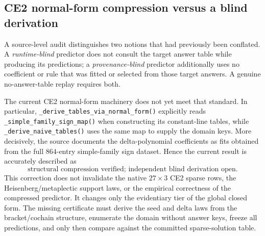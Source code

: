 \subsection{CE2 normal-form compression versus a blind derivation}
\label{subsec:ce2-blindness}

A source-level audit distinguishes two notions that had previously been conflated.  A
\emph{runtime-blind} predictor does not consult the target answer table while producing its
predictions; a \emph{provenance-blind} predictor additionally uses no coefficient or rule
that was fitted or selected from those target answers.  A genuine no-answer-table replay
requires both.

The current CE2 normal-form machinery does not yet meet that standard.  In particular,
\verb|_derive_tables_via_normal_form()| explicitly reads
\verb|_simple_family_sign_map()| when constructing its constant-line tables, while
\verb|_derive_naive_tables()| uses the same map to supply the domain keys.  More decisively,
the source documents the delta-polynomial coefficients as fits obtained from the full
$864$-entry simple-family sign dataset.  Hence the current result is accurately described as
\[
 \boxed{\text{structural compression verified; independent blind derivation open}.}
\]
This correction does not invalidate the native $27\times3$ CE2 sparse rows, the
Heisenberg/metaplectic support laws, or the empirical correctness of the compressed
predictor.  It changes only the evidentiary tier of the global closed form.  The missing
certificate must derive the seed and delta laws from the bracket/cochain structure,
enumerate the domain without answer keys, freeze all predictions, and only then compare
against the committed sparse-solution table.
